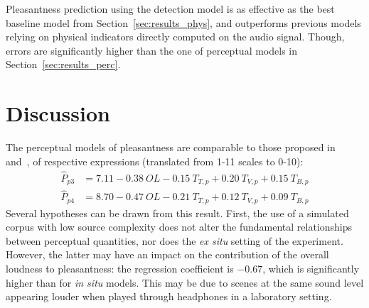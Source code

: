 \documentclass[11pt,a4paper]{article}
\begin{document}
Pleasantness prediction using the detection model is as effective as the best baseline model from Section~\ref{sec:results_phys}, and outperforms previous models relying on physical indicators directly computed on the audio signal. Though, errors are significantly higher than the one of perceptual models in Section~\ref{sec:results_perc}.\\


\section{Discussion}
\label{sec:discussion}

The perceptual models of pleasantness are comparable to those proposed in~\cite{ricciardi2014} and~\cite{aumond2017}, of respective expressions (translated from 1-11 scales to 0-10):
\begin{align}
\hat P_{p3} &= 7.11 - 0.38~OL - 0.15~T_{T, p} + 0.20~T_{V, p} + 0.15~T_{B, p}\\
\hat P_{p4} &= 8.70 - 0.47~OL - 0.21~T_{T, p} + 0.12~T_{V, p} + 0.09~T_{B, p}
\end{align}
Several hypotheses can be drawn from this result. First, the use of a simulated corpus with low source complexity does not alter the fundamental relationships between perceptual quantities, nor does the \textit{ex situ} setting of the experiment. However, the latter may have an impact on the contribution of the overall loudness to pleasantness: the regression coefficient is $-0.67$, which is significantly higher than for \textit{in situ} models. This may be due to scenes at the same sound level appearing louder when played through headphones in a laboratory setting.\\
\end{document}
